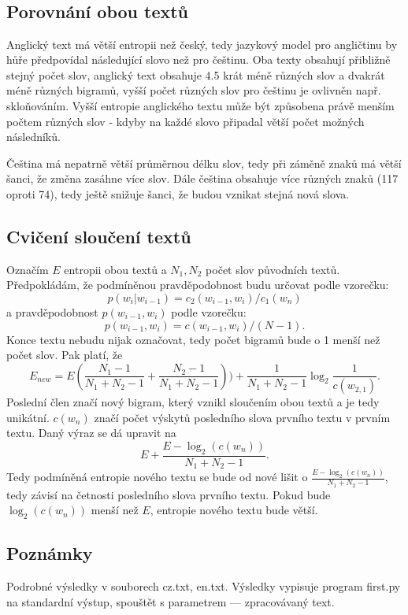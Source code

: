 \documentclass[12pt, a4paper]{report}
\theoremstyle{remark}
\begin{document}
\




\

\

\







\subsection*{Porovnání obou textů}
Anglický text má větší entropii než český, tedy jazykový model pro angličtinu by hůře předpovídal následující slovo než pro češtinu. Oba texty obsahují přibližně stejný počet slov, anglický text obsahuje 4.5 krát méně různých slov a dvakrát méně různých bigramů, vyšší počet různých slov pro češtinu je ovlivněn např. skloňováním. Vyšší entropie anglického textu může být způsobena právě menším počtem různých slov - kdyby na každé slovo připadal větší počet možných následníků. 

Čeština má nepatrně větší průměrnou délku slov, tedy při záměně znaků má větší šanci, že změna zasáhne více slov. Dále čeština obsahuje více různých znaků (117 oproti 74), tedy ještě snižuje šanci, že budou vznikat stejná nová slova.

\subsection*{Cvičení sloučení textů}
Označím $E$ entropii obou textů a $N_1,N_2$ počet slov původních textů. Předpokládám, že podmíněnou pravděpodobnost budu určovat podle vzorečku: $$p(w_i|w_{i-1})=c_2(w_{i-1},w_i)/c_1(w_{n})$$ a pravděpodobnost $p(w_{i-1},w_{i})$ podle vzorečku: $$p(w_{i-1},w_{i})=c(w_{i-1},w_{i})/(N-1).$$ Konce textu nebudu nijak označovat, tedy počet bigramů bude o 1 menší než počet slov. Pak platí, že 
$$ E_{new}= E(\frac{N_1-1}{N_1+N_2-1}+\frac{N_2-1}{N_1+N_2-1}))+\frac{1}{N_1+N_2-1}\log_2{\frac{1}{c(w_{2,1})}}. $$
Poslední člen značí nový bigram, který vznikl sloučením obou textů a je tedy unikátní. $c(w_n)$ značí počet výskytů posledního slova prvního textu v prvním textu. Daný výraz se dá upravit na
$$ E+\frac{E-\log_2(c(w_{n}))}{N_1+N_2-1}. $$
Tedy podmíněná entropie nového textu se bude od nové lišit o $\frac{E-\log_2(c(w_{n}))}{N_1+N_2-1}$, tedy závisí na četnosti posledního slova prvního textu. Pokud bude $\log_2(c(w_{n}))$ menší než $E$, entropie nového textu bude větší.

\subsection*{Poznámky}
Podrobné výsledky v souborech cz.txt, en.txt.
Výsledky vypisuje program first.py na standardní výstup, spouštět s parametrem --- zpracovávaný text.
\end{document}
